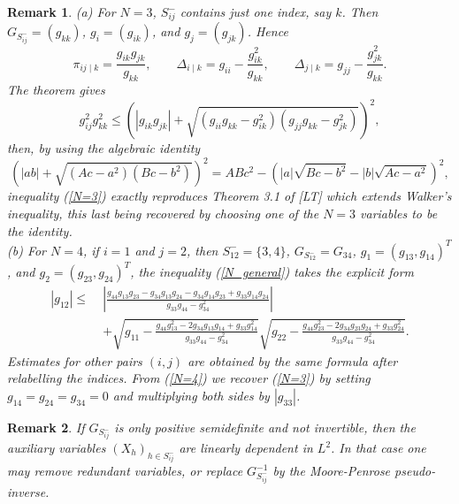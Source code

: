 \documentclass[11pt]{article}
\newtheorem{remark}{Remark}
\begin{document}
\begin{remark}
(a) For $N=3$, $S^{-}_{ij}$ contains just one index, say $k$. Then $G_{S^{-}_{ij}}=({g}_{kk})$, $g_i=({g}_{ik})$, and $g_j=({g}_{jk})$. Hence
\begin{equation}
\pi_{ij\mid k}=\frac{{g}_{ik}{g}_{jk}}{{g}_{kk}},
\qquad
\Delta_{i\mid k}={g}_{ii}-\frac{{g}_{ik}^2}{{g}_{kk}},
\qquad
\Delta_{j\mid k}={g}_{jj}-\frac{{g}_{jk}^2}{{g}_{kk}}.
\end{equation}
The theorem gives
\begin{equation}\label{N=3}
{g}_{ij}^2g_{kk}^2
\leq
\left(
\left|{g}_{ik}{g}_{jk}
\right|
+
\sqrt{
\left({g}_{ii}g_{kk}-{g}_{ik}^2\right)
\left({g}_{jj}g_{kk}-{g}_{jk}^2\right)
}
\right)^2,
\end{equation}
then, by using the algebraic identity 
$$
\left(
|ab|+
\sqrt{(Ac-a^2)(Bc-b^2)}
\right)^2
=
ABc^2
-
\left(
|a|\sqrt{Bc-b^2}
-
|b|\sqrt{Ac-a^2}
\right)^2,
$$
inequality (\ref{N=3}) exactly reproduces Theorem 3.1 of [LT] which extends Walker's inequality, this last being recovered by choosing one of the $N=3$ variables to be the identity.\\
(b) For $N=4$, if $i=1$ and $j=2$, then $S^{-}_{12}=\{3,4\}$, $G_{S^{-}_{12}}=G_{34}$, $g_1=({g}_{13},{g}_{14})^T$, and $g_2=({g}_{23},{g}_{24})^T$, the inequality (\ref{N_general}) takes the explicit form 
\begin{equation}\label{N=4}
\begin{aligned}
\left| g_{12} \right|
\leq\;&
\left|
\frac{
g_{44}g_{13}g_{23}
-
g_{34}g_{13}g_{24}
-
g_{34}g_{14}g_{23}
+
g_{33}g_{14}g_{24}
}{
g_{33}g_{44}-g_{34}^2
}
\right|
\\[0.5em]
&+
\sqrt{
g_{11}
-
\frac{
g_{44}g_{13}^2
-
2g_{34}g_{13}g_{14}
+
g_{33}g_{14}^2
}{
g_{33}g_{44}-g_{34}^2
}
}
\sqrt{
g_{22}
-
\frac{
g_{44}g_{23}^2
-
2g_{34}g_{23}g_{24}
+
g_{33}g_{24}^2
}{
g_{33}g_{44}-g_{34}^2
}
}.
\end{aligned}
\end{equation}
Estimates for other pairs $(i,j)$ are obtained by the same formula after relabelling the indices. From (\ref{N=4}) we recover (\ref{N=3}) by setting $g_{14}=g_{24}=g_{34}=0$ and multiplying both sides by $|g_{33}|$.
\end{remark}
\begin{remark}
If $G_{S^{-}_{ij}}$ is only positive semidefinite and not invertible, then the auxiliary variables $(X_h)_{h\in S^{-}_{ij}}$ are linearly dependent in $L^2$. In that case one may remove redundant variables, or replace $G_{S^{-}_{ij}}^{-1}$ by the Moore-Penrose pseudo-inverse.
\end{remark}
\end{document}
